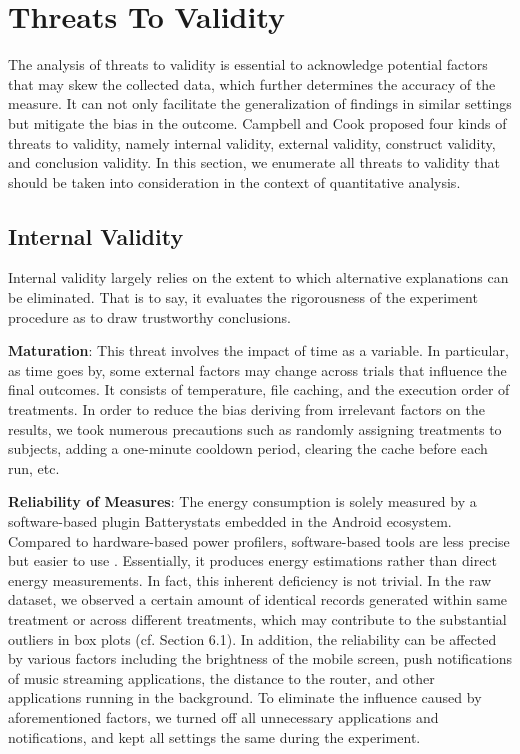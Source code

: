 \section{Threats To Validity}\label{sec:threats}
The analysis of threats to validity is essential to acknowledge potential factors that may skew the collected data, which further determines the accuracy of the measure. It can not only facilitate the generalization of findings in similar settings but mitigate the bias in the outcome. Campbell and Cook \cite{36} proposed four kinds of threats to validity, namely internal validity, external validity, construct validity, and conclusion validity. In this section, we enumerate all threats to validity that should be taken into consideration in the context of quantitative analysis. 

\subsection{Internal Validity}
Internal validity largely relies on the extent to which alternative explanations can be eliminated. That is to say, it evaluates the rigorousness of the experiment procedure as to draw trustworthy conclusions.  

\textbf{Maturation}: This threat involves the impact of time as a variable. In particular, as time goes by, some external factors may change across trials that influence the final outcomes. It consists of temperature, file caching, and the execution order of treatments. In order to reduce the bias deriving from irrelevant factors on the results, we took numerous precautions such as randomly assigning treatments to subjects, adding a one-minute cooldown period, clearing the cache before each run, etc.  

\textbf{Reliability of Measures}: The energy consumption is solely measured by a software-based plugin Batterystats embedded in the Android ecosystem. Compared to hardware-based power profilers, software-based tools are less precise but easier to use \cite{37}. Essentially, it produces energy estimations rather than direct energy measurements. In fact, this inherent deficiency is not trivial. In the raw dataset, we observed a certain amount of identical records generated within same treatment or across different treatments, which may contribute to the substantial outliers in box plots (cf. Section 6.1). In addition, the reliability can be affected by various factors including the brightness of the mobile screen, push notifications of music streaming applications, the distance to the router, and other applications running in the background. To eliminate the influence caused by aforementioned factors, we turned off all unnecessary applications and notifications, and kept all settings the same during the experiment.   

